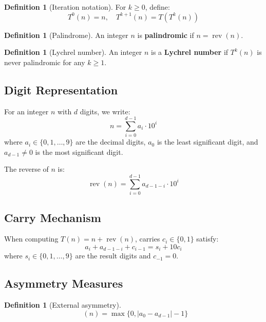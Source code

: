 \documentclass[11pt,a4paper]{article}
\theoremstyle{plain}
\theoremstyle{definition}
\newtheorem{definition}[theorem]{Definition}
\DeclareMathOperator{\rev}{rev}
\DeclareMathOperator{\Aext}{A^{\text{(ext)}}}
\begin{document}
\begin{definition}[Iteration notation]
For $k \geq 0$, define:
\begin{equation}
T^0(n) = n, \quad T^{k+1}(n) = T(T^k(n))
\end{equation}
\end{definition}

\begin{definition}[Palindrome]
An integer $n$ is \textbf{palindromic} if $n = \rev(n)$.
\end{definition}

\begin{definition}[Lychrel number]
An integer $n$ is a \textbf{Lychrel number} if $T^k(n)$ is never palindromic for any $k \geq 1$.
\end{definition}

\subsection{Digit Representation}

For an integer $n$ with $d$ digits, we write:
\begin{equation}
n = \sum_{i=0}^{d-1} a_i \cdot 10^i
\end{equation}
where $a_i \in \{0, 1, \ldots, 9\}$ are the decimal digits, $a_0$ is the least significant digit, and $a_{d-1} \neq 0$ is the most significant digit.

The reverse of $n$ is:
\begin{equation}
\rev(n) = \sum_{i=0}^{d-1} a_{d-1-i} \cdot 10^i
\end{equation}

\subsection{Carry Mechanism}

When computing $T(n) = n + \rev(n)$, carries $c_i \in \{0, 1\}$ satisfy:
\begin{equation}
a_i + a_{d-1-i} + c_{i-1} = s_i + 10 c_i
\end{equation}
where $s_i \in \{0, 1, \ldots, 9\}$ are the result digits and $c_{-1} = 0$.

\subsection{Asymmetry Measures}

\begin{definition}[External asymmetry]
\begin{equation}
\Aext(n) = \max\{0, |a_0 - a_{d-1}| - 1\}
\end{equation}
\end{definition}
\end{document}
